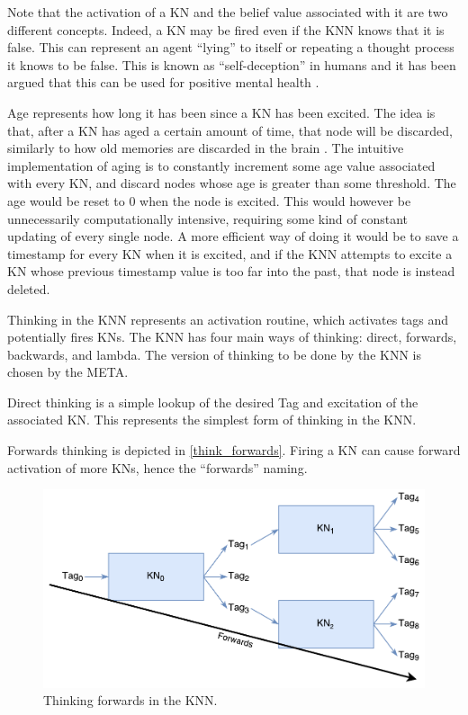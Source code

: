 \documentclass[titlepage,11pt]{article}
\begin{document}
Note that the activation of a KN and the belief value associated with it are two different concepts. Indeed, a KN may be fired even if the KNN knows that it is false. This can represent an agent ``lying'' to itself or repeating a thought process it knows to be false. This is known as ``self-deception'' in humans and it has been argued that this can be used for positive mental health \cite{taylor1989positive}.

Age represents how long it has been since a KN has been excited. The idea is that, after a KN has aged a certain amount of time, that node will be discarded, similarly to how old memories are discarded in the brain \cite{aging}. The intuitive implementation of aging is to constantly increment some age value associated with every KN, and discard nodes whose age is greater than some threshold. The age would be reset to 0 when the node is excited. This would however be unnecessarily computationally intensive, requiring some kind of constant updating of every single node. A more efficient way of doing it would be to save a timestamp for every KN when it is excited, and if the KNN attempts to excite a KN whose previous timestamp value is too far into the past, that node is instead deleted.

Thinking in the KNN represents an activation routine, which activates tags and potentially fires KNs. The KNN has four main ways of thinking: direct, forwards, backwards, and lambda. The version of thinking to be done by the KNN is chosen by the META.

Direct thinking is a simple lookup of the desired Tag and excitation of the associated KN. This represents the simplest form of thinking in the KNN.

Forwards thinking is depicted in \autoref{think_forwards}. Firing a KN can cause forward activation of more KNs, hence the ``forwards'' naming.

\begin{figure}[!htb]
	\includegraphics[width=\columnwidth]{figures/forwards_thinking.pdf}
	\caption{Thinking forwards in the KNN.}
	\label{think_forwards}
\end{figure}
\end{document}

